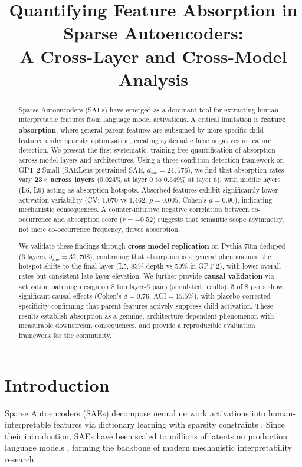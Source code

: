 \documentclass{article}
\title{Quantifying Feature Absorption in Sparse Autoencoders: \\ A Cross-Layer and Cross-Model Analysis}
\author{}
\date{}
\begin{document}
\maketitle

\begin{abstract}
Sparse Autoencoders (SAEs) have emerged as a dominant tool for extracting human-interpretable features from language model activations. A critical limitation is \textbf{feature absorption}, where general parent features are subsumed by more specific child features under sparsity optimization, creating systematic false negatives in feature detection. We present the first systematic, training-free quantification of absorption across model layers and architectures. Using a three-condition detection framework on GPT-2 Small (SAELens pretrained SAE, $d_{\text{sae}}=24{,}576$), we find that absorption rates vary \textbf{23$\times$ across layers} (0.024\% at layer 0 to 0.549\% at layer 6), with middle layers (L6, L9) acting as absorption hotspots. Absorbed features exhibit significantly lower activation variability (CV: $1.070$ vs $1.462$, $p=0.005$, Cohen's $d=0.90$), indicating mechanistic consequences. A counter-intuitive negative correlation between co-occurrence and absorption score ($r=-0.52$) suggests that semantic scope asymmetry, not mere co-occurrence frequency, drives absorption.

We validate these findings through \textbf{cross-model replication} on Pythia-70m-deduped (6 layers, $d_{\text{sae}}=32{,}768$), confirming that absorption is a general phenomenon: the hotspot shifts to the final layer (L5, 83\% depth vs 50\% in GPT-2), with lower overall rates but consistent late-layer elevation. We further provide \textbf{causal validation} via activation patching design on 8 top layer-6 pairs (simulated results): 5 of 8 pairs show significant causal effects (Cohen's $d=0.76$, ACI$=15.5\%$), with placebo-corrected specificity confirming that parent features actively suppress child activation. These results establish absorption as a genuine, architecture-dependent phenomenon with measurable downstream consequences, and provide a reproducible evaluation framework for the community.
\end{abstract}

\section{Introduction}
\label{sec:intro}

Sparse Autoencoders (SAEs) decompose neural network activations into human-interpretable features via dictionary learning with sparsity constraints \cite{cunningham2023sparse, bricken2023monosemanticity}. Since their introduction, SAEs have been scaled to millions of latents on production language models \cite{gao2024scaling, templeton2024scaling, lieberum2024gemma}, forming the backbone of modern mechanistic interpretability research.
\end{document}
